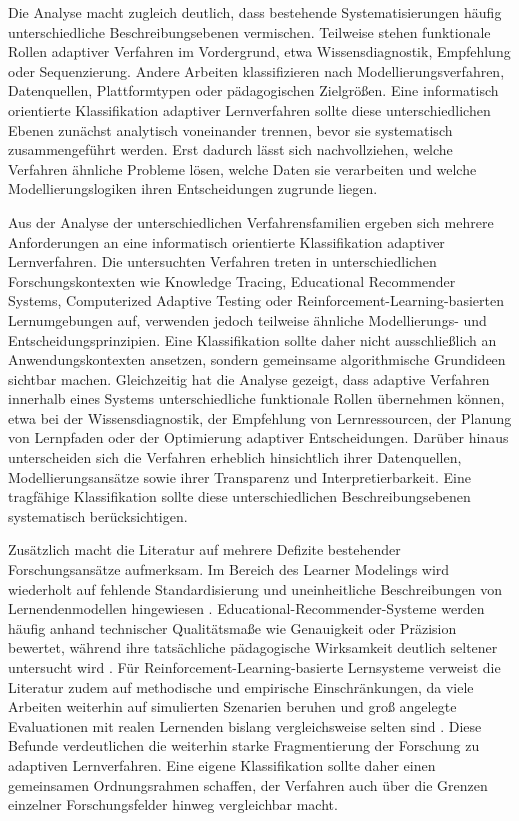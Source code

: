 Die Analyse macht zugleich deutlich, dass bestehende Systematisierungen
häufig unterschiedliche Beschreibungsebenen vermischen. Teilweise stehen
funktionale Rollen adaptiver Verfahren im Vordergrund, etwa
Wissensdiagnostik, Empfehlung oder Sequenzierung. Andere Arbeiten
klassifizieren nach Modellierungsverfahren, Datenquellen, Plattformtypen
oder pädagogischen Zielgrößen. Eine informatisch orientierte
Klassifikation adaptiver Lernverfahren sollte diese unterschiedlichen
Ebenen zunächst analytisch voneinander trennen, bevor sie systematisch
zusammengeführt werden. Erst dadurch lässt sich nachvollziehen, welche
Verfahren ähnliche Probleme lösen, welche Daten sie verarbeiten und
welche Modellierungslogiken ihren Entscheidungen zugrunde liegen.

Aus der Analyse der unterschiedlichen Verfahrensfamilien ergeben sich
mehrere Anforderungen an eine informatisch orientierte Klassifikation
adaptiver Lernverfahren. Die untersuchten Verfahren treten in
unterschiedlichen Forschungskontexten wie Knowledge Tracing, Educational
Recommender Systems, Computerized Adaptive Testing oder
Reinforcement-Learning-basierten Lernumgebungen auf, verwenden jedoch
teilweise ähnliche Modellierungs- und Entscheidungsprinzipien. Eine
Klassifikation sollte daher nicht ausschließlich an Anwendungskontexten
ansetzen, sondern gemeinsame algorithmische Grundideen sichtbar machen.
Gleichzeitig hat die Analyse gezeigt, dass adaptive Verfahren innerhalb
eines Systems unterschiedliche funktionale Rollen übernehmen können,
etwa bei der Wissensdiagnostik, der Empfehlung von Lernressourcen, der
Planung von Lernpfaden oder der Optimierung adaptiver Entscheidungen.
Darüber hinaus unterscheiden sich die Verfahren erheblich hinsichtlich
ihrer Datenquellen, Modellierungsansätze sowie ihrer Transparenz und
Interpretierbarkeit. Eine tragfähige Klassifikation sollte diese
unterschiedlichen Beschreibungsebenen systematisch berücksichtigen.

Zusätzlich macht die Literatur auf mehrere Defizite bestehender
Forschungsansätze aufmerksam. Im Bereich des Learner Modelings wird
wiederholt auf fehlende Standardisierung und uneinheitliche
Beschreibungen von Lernendenmodellen hingewiesen \citep{Boeck2025}.
Educational-Recommender-Systeme werden häufig anhand technischer
Qualitätsmaße wie Genauigkeit oder Präzision bewertet, während ihre
tatsächliche pädagogische Wirksamkeit deutlich seltener untersucht wird
\citep{daSilva2023}. Für Reinforcement-Learning-basierte Lernsysteme
verweist die Literatur zudem auf methodische und empirische
Einschränkungen, da viele Arbeiten weiterhin auf simulierten Szenarien
beruhen und groß angelegte Evaluationen mit realen Lernenden bislang
vergleichsweise selten sind \citep{Riedmann2025}. Diese Befunde
verdeutlichen die weiterhin starke Fragmentierung der Forschung zu
adaptiven Lernverfahren. Eine eigene Klassifikation sollte daher einen
gemeinsamen Ordnungsrahmen schaffen, der Verfahren auch über die Grenzen
einzelner Forschungsfelder hinweg vergleichbar macht.

